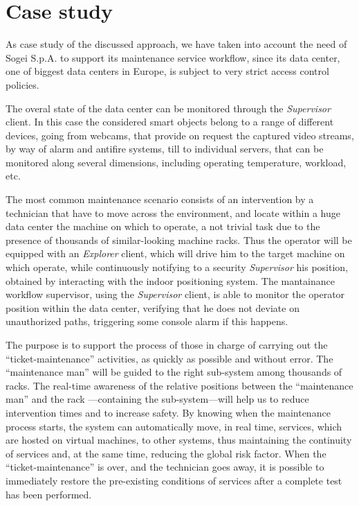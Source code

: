 \section{Case study}\label{case-study}

As case study of the discussed approach, we have taken into account the need of Sogei S.p.A. to support its maintenance service  workflow, since its data center, one of biggest data centers in Europe, is subject to very strict access control policies. 

The overal state of the data center can be monitored through the \emph{Supervisor} client. In this case the considered smart objects belong to a range of different devices, going from webcams, that provide on request the captured video streams, by way of alarm and antifire systems, till to individual servers, that can be monitored along several dimensions, including operating temperature, workload, etc. 

The most common maintenance scenario consists of an intervention by a technician that have to move across the environment, and locate within a huge data center the machine on which to operate, a not trivial task due to the presence of thousands of similar-looking machine racks. Thus the operator will be equipped with an \emph{Explorer} client, which will drive him to the target machine on which operate, while continuously notifying to a security \emph{Supervisor} his position, obtained by interacting with the indoor positioning system.
The mantainance workflow supervisor, using the \emph{Supervisor} client, is able to monitor the operator position within the data center, verifying that he does not deviate on unauthorized paths, triggering some console alarm if this happens.

The purpose is to support  the process of those in charge of carrying out the ``ticket-maintenance'' activities, as quickly  as possible and without error. The ``maintenance man'' will be guided to the right sub-system among thousands of racks. The real-time awareness of the relative positions between the ``maintenance man'' and the rack ---containing the sub-system---will help us to reduce intervention times and to increase safety. By  knowing when the maintenance process starts, the system  can automatically move, in real time, services, which are hosted on virtual machines, to other systems, thus maintaining the continuity of services and, at the same time,  reducing  the global risk factor. When the ``ticket-maint\-enan\-ce'' is over, and the technician goes away, it is possible to immediately  restore  the pre-existing conditions of services after a complete test has been performed.




